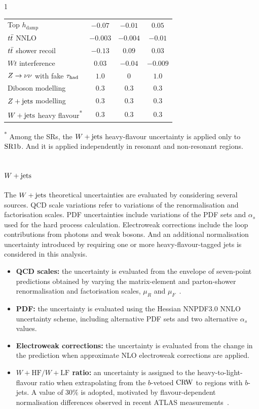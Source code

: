 \begin{table}[htbp]
\begin{spacing}{1}
\begin{tabular*}{\textwidth}{@{\extracolsep{\fill}}lccc@{}}
        Top $h_{\mathrm{damp}}$ & $-0.07$ & $-0.01$ & $0.05$ \\
        $t\bar{t}$ NNLO & $-0.003$ & $-0.004$ & $-0.01$ \\
        $t\bar{t}$ shower recoil & $-0.13$ & $0.09$ & $0.03$ \\
        $Wt$ interference & $0.03$ & $-0.04$ & $-0.009$ \\
        \midrule
        $Z\rightarrow\nu\nu$ with fake $\tau_{\mathrm{had}}$ & $1.0$ & $0$ & $1.0$ \\
        Diboson modelling & $0.3$ & $0.3$ & $0.3$ \\
        $Z+\mathrm{jets}$ modelling & $0.3$ & $0.3$ & $0.3$ \\
        $W+\mathrm{jets}$ heavy flavour\textsuperscript{*} & $0.3$ & $0.3$ & $0.3$ \\
        \bottomrule
    \end{tabular*}
    \par\smallskip
    \raggedright
    \textsuperscript{*} Among the SRs, the $W+\mathrm{jets}$ heavy-flavour uncertainty is applied only to $\mathrm{SR1b}$. And it is applied independently in resonant and non-resonant regions.
    \end{spacing}
\end{table}


\subsection{$W+\mathrm{jets}$}
\label{subsec:ch9_wjets}
The $W+\mathrm{jets}$ theoretical uncertainties are evaluated by considering several sources.
QCD scale variations refer to variations of the renormalisation and factorisation scales.
PDF uncertainties include variations of the PDF sets and $\alpha_s$ used for the hard process calculation.
Electroweak corrections include the loop contributions from photons and weak bosons. And an additional normalisation uncertainty introduced by requiring one or more heavy-flavour-tagged jets is considered in this analysis.
\begin{itemize}[nosep,leftmargin=*]
    \item \textbf{QCD scales:} the uncertainty is evaluated from the envelope of seven-point predictions obtained by varying the matrix-element and parton-shower renormalisation and factorisation scales, $\mu_R$ and $\mu_F$~\cite{PMGR-2021-01}.
    \item \textbf{PDF:} the uncertainty is evaluated using the Hessian NNPDF3.0 NNLO uncertainty scheme, including alternative PDF sets and two alternative $\alpha_s$ values.
    \item \textbf{Electroweak corrections:} the uncertainty is evaluated from the change in the prediction when approximate NLO electroweak corrections are applied.
    \item \textbf{$W+\mathrm{HF}/W+\mathrm{LF}$ ratio:} an uncertainty is assigned to the heavy-to-light-flavour ratio when extrapolating from the $b$-vetoed $\mathrm{CRW}$ to regions with $b$-jets.
    A value of $30\%$ is adopted, motivated by flavour-dependent normalisation differences observed in recent ATLAS measurements~\cite{HIGG-2020-20,ATLAS2026WbJets}.
\end{itemize}


